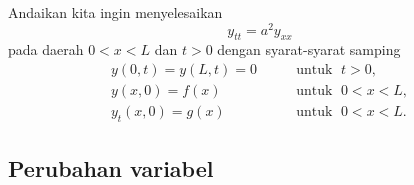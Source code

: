 Andaikan kita ingin menyelesaikan 
\begin{equation} \label{dalemb:weq}
y_{tt} = a^2 y_{xx}
\end{equation}
pada daerah $0 < x < L$ dan $t > 0$
dengan syarat-syarat samping
\begin{equation} \label{dalemb:weqside}
\begin{array}{ll}
y(0,t) =  y(L,t) = 0 &
\qquad \text{untuk } \; t > 0 , \\
y(x,0) = f(x) & \qquad \text{untuk } \; 0 < x < L , \\
y_t(x,0) = g(x) &  \qquad \text{untuk } \; 0 < x < L .
\end{array}
\end{equation}

\subsection{Perubahan variabel}


